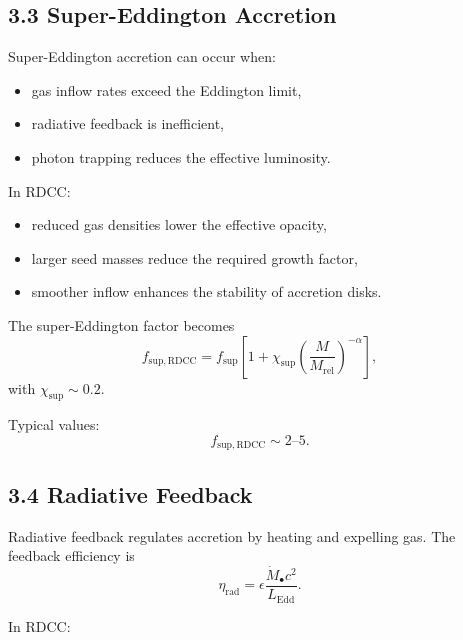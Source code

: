 \documentclass[11pt,a4paper]{article}
\begin{document}
\subsection*{3.3 Super-Eddington Accretion}

Super-Eddington accretion can occur when:

\begin{itemize}
    \item gas inflow rates exceed the Eddington limit,
    \item radiative feedback is inefficient,
    \item photon trapping reduces the effective luminosity.
\end{itemize}

In RDCC:

\begin{itemize}
    \item reduced gas densities lower the effective opacity,
    \item larger seed masses reduce the required growth factor,
    \item smoother inflow enhances the stability of accretion disks.
\end{itemize}

The super-Eddington factor becomes
\begin{equation}
    f_{\mathrm{sup,RDCC}}
    = f_{\mathrm{sup}}
      \left[
        1 + \chi_{\mathrm{sup}}
        \left(\frac{M}{M_{\mathrm{rel}}}\right)^{-\alpha}
      \right],
\end{equation}
with $\chi_{\mathrm{sup}} \sim 0.2$.

Typical values:
\begin{equation}
    f_{\mathrm{sup,RDCC}} \sim 2\text{--}5.
\end{equation}

\subsection*{3.4 Radiative Feedback}

Radiative feedback regulates accretion by heating and expelling gas. The feedback efficiency 
is
\begin{equation}
    \eta_{\mathrm{rad}}
    = \epsilon \frac{\dot{M}_{\bullet} c^{2}}{L_{\mathrm{Edd}}}.
\end{equation}

In RDCC:
\end{document}
